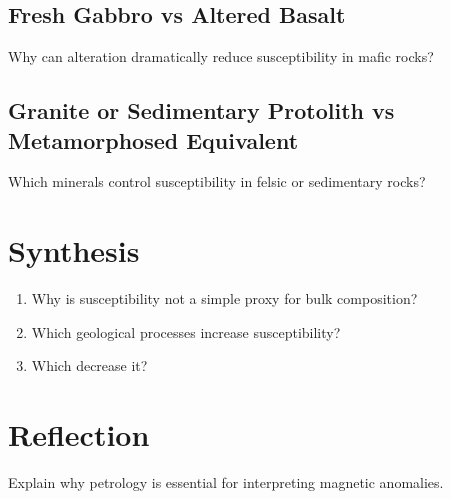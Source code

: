 \documentclass[11pt,a4paper]{article}
\begin{document}
\vspace{3cm}

\subsection*{Fresh Gabbro vs Altered Basalt}
Why can alteration dramatically reduce susceptibility in mafic rocks?

\vspace{3cm}

\subsection*{Granite or Sedimentary Protolith vs Metamorphosed Equivalent}
Which minerals control susceptibility in felsic or sedimentary rocks?

\vspace{3cm}

\section*{Synthesis}

\begin{enumerate}
  \item Why is susceptibility not a simple proxy for bulk composition?
  \item Which geological processes increase susceptibility?
  \item Which decrease it?
\end{enumerate}

\section*{Reflection}

Explain why petrology is essential for interpreting magnetic anomalies.
\end{document}
